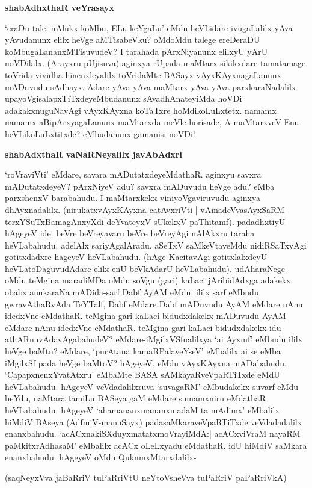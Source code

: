 \noindent
\textbf{shabAdhxthaR veYrasayx}\label{page112}

`eraDu tale, nAlukx koMbu, ELu keYgaLu' eMdu heVLidare-ivugaLalilx yAva 
yAvudanunx elilx heVge aMTisabeVku? oMdoMdu talege ereDeraDU koMbugaLananxMTisuvudeV? I tarahada pArxNiyanunx elilxyU yArU noVDilalx. (Arayxru pUjisuva) aginxya rUpada maMtarx sikikxdare tamatamage toVrida vividha hinenxleyalilx toVridaMte BASayx-vAyxKAyxnagaLanunx mADuvudu sAdhayx. Adare yAva yAva maMtarx yAva yAva parxkaraNadalilx upayoVgisalapxTiTxdeyeMbudanunx sAvadhAnateyiMda hoVDi adakakxnuguNavAgi vAyxKAyxna koTaTxre hoMdikoLuLxtetx. namamx namamx aBipArxyagaLanunx maMtarxda meVle horisade, A maMtarxveV Enu heVLikoLuLxtitxde? eMbudanunx gamanisi noVDi!

\noindent
\textbf{shabAdxthaR vaNaRNeyalilx javAbAdxri}\label{page112}

`roVraviVti' eMdare, savara mADutatxdeyeMdathaR. aginxyu savxra 
mADutatxdeyeV? pArxNiyeV adu? savxra mADuvudu heVge adu? eMba 
parxshenxV barabahudu. I maMtarxkekx viniyoVgaviruvudu aginxya 
dhAyxnadalilx. (nirukatxvAyxKAyxna-catAvxriVti | vAmadeVvasAyxSaRM\label{112} 
terxYSuTxBamagAnxyXdi deYvateyxV sUkekxV paThitamf). padadhxtiyU hAgeyeV ide. beVre beVreyavaru beVre beVreyAgi nAlAkxru taraha heVLabahudu. adelAlx sariyAgalAradu. aSeTxV saMkeVtaveMdu nidiRSaTxvAgi gotitxdadxre hageyeV heVLabahudu. (hAge KacitavAgi gotitxlalxdeyU heVLatoDaguvudAdare elilx enU beVkAdarU heVLabahudu). udAharaNege-oMdu teMgina maradiMDa oMdu soVgu (gari) kaLaci jAribidAdxga adakekx obabx anukaraNa mADida-sarf Dabf AyAM eMdu. ililx sarf eMbudu gwravAthaRvAda TeYTalf, Dabf eMdare Dabf mADuvudu AyAM eMdare nAnu idedxVne eMdathaR. teMgina gari kaLaci bidudxdakekx mADuvudu AyAM eMdare nAnu idedxVne eMdathaR. teMgina gari kaLaci bidudxdakekx idu athARnuvAdavAgabahudeV? eMdare-iMgilxVSfnalilxya `ai Ayxmf' eMbudu ililx heVge baMtu? eMdare, `purAtana kamaRPalaveYseV' eMbalilx ai se eMba iMgilxSf pada heVge baMtoV? hAgeyeV, eMdu vAyxKAyxna mADabahudu. `CapapxnenxYvatAtxru' eMbaMte BASA sAMkayaRveVpaRTiTxde eMdU heVLabahudu. hAgeyeV veVdadalilxruva `suvagaRM' eMbudakekx suvarf eMdu beYdu, naMtara tamiLu BASeya gaM eMdare sumamxniru eMdathaR heVLabahudu. hAgeyeV `ahamananxmananxmadaM ta mAdimx' eMbalilx hiMdiV BAseya (AdfmiV-manuSayx) padasaMkaraveVpaRTiTxde veVdadadalilx enanxbahudu. `acACxnakiSXduyxmatatxmoVrayiMdA:| acACxviVraM nayaRM paMkitxrAdhasaM' eMbalilx acACx oLeLxyadu eMdathaR. idU hiMdiV saMkara enanxbahudu. hAgeyeV oMdu QuknmxMtarxdalilx-

(saqNeyxVva jaBaRriV tuPaRriVtU neYtoVsheVva tuPaRriV paPaRriVkA)\label{113}

